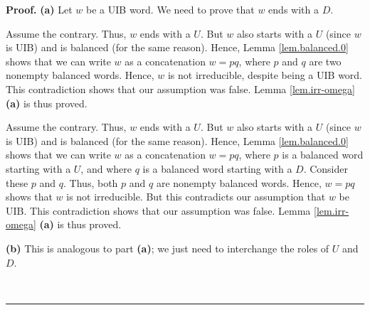 \documentclass[numbers=enddot,12pt,final,onecolumn,notitlepage]{scrartcl}%
\theoremstyle{definition}
\newenvironment{proof}[1][Proof]{\noindent\textbf{#1.} }{\ \rule{0.5em}{0.5em}}
\newenvironment{verlong}{}{}
\newenvironment{vershort}{}{}
\begin{document}
\begin{proof}
\textbf{(a)} Let $w$ be a UIB word. We need to prove that $w$ ends with a $D$.

\begin{vershort}
Assume the contrary. Thus, $w$ ends with a $U$. But $w$ also starts with a $U$
(since $w$ is UIB) and is balanced (for the same reason). Hence, Lemma
\ref{lem.balanced.0} shows that we can write $w$ as a concatenation $w=pq$,
where $p$ and $q$ are two nonempty balanced words. Hence, $w$ is not
irreducible, despite being a UIB word.
This contradiction shows that our assumption was false.
Lemma \ref{lem.irr-omega} \textbf{(a)} is thus proved.
\end{vershort}

\begin{verlong}
Assume the contrary. Thus, $w$ ends with a $U$. But $w$ also starts with a $U$
(since $w$ is UIB) and is balanced (for the same reason). Hence, Lemma
\ref{lem.balanced.0} shows that we can write $w$ as a concatenation $w=pq$,
where $p$ is a balanced word starting with a $U$, and where $q$ is a balanced
word starting with a $D$. Consider these $p$ and $q$. Thus, both $p$ and $q$
are nonempty balanced words. Hence, $w=pq$ shows that $w$ is not irreducible.
But this contradicts our assumption that $w$ be UIB. This contradiction shows
that our assumption was false. Lemma \ref{lem.irr-omega} \textbf{(a)} is thus proved.
\end{verlong}

\textbf{(b)} This is analogous to part \textbf{(a)}; we just need to
interchange the roles of $U$ and $D$.


\end{proof}
\end{document}

